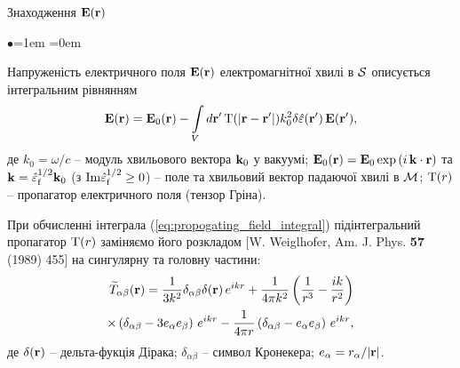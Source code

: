 \documentclass[10pt]{beamer}
\begin{document}
\begin{frame}{Знаходження ${\bf E} ({\bf r})$}
\footnotesize

\begin{list}{$\bullet$}{\leftmargin=1em \itemindent=0em}
\item
Напруженість електричного поля ${\bf E} ({\bf r})$ електромагнітної хвилі в $\cal{S}$ описується інтегральним рівнянням
\begin{equation}\label{eq:propogating_field_integral} 
{\rm {\bf E}}({\rm {\bf r}}) = {\rm {\bf E}}_{0} ({\rm
{\bf r}}) - {\int\limits_{V} {d{\rm {\bf {r}'}}\,}} {\rm T}(|{\rm {\bf
r}}-{\rm {\bf {r}'}}|) k_{0}^{2} \delta \hat{\varepsilon} ({\rm
{\bf {r}'}})\,{\rm {\bf E}}({\rm {\bf {r}'}}),
\end{equation}
де $k_0=\omega/c$ -- модуль хвильового вектора ${\bf k}_0$ у вакуумі; ${\bf E}_0 ({\bf r}) = {\bf E}_0 \exp{(i\, {\bf k} \cdot{\bf r})}$ та ${\bf k} = \hat{\varepsilon}_{\rm f}^{1/2} {\bf k}_0$ (з ${\rm Im}{\hat{\varepsilon}_{\rm f}}^{1/2} \geq 0$) -- поле та хвильовий вектор падаючої хвилі в $\cal{M}$;
${\rm T}(r)$ -- пропагатор електричного поля (тензор Гріна). 

\item
При обчисленні інтеграла (\ref{eq:propogating_field_integral}) підінтегральний пропагатор ${\rm T}(r)$ заміняємо його розкладом [W. Weiglhofer, Am. J. Phys. {\bf 57} (1989) 455] на сингулярну та головну частини:
\begin{eqnarray}\label{eq:propog_representation} 
{\widetilde T}_{\alpha\beta} ({\rm {\bf
r}}) = \frac{1}{3k^{2}} \delta_{\alpha\beta} \delta ({\rm {\bf
r}})\,e^{ikr} + \frac{1}{4\pi k^{2}}
\left(\frac{1}{r^3}-\frac{ik}{r^2}\right)\nonumber\\
\times\left( \delta _{\alpha\beta} - 3e_{\alpha} e_{\beta}
\right)\,e^{ikr} - \frac{1}{4\pi r}\left( {\delta _{\alpha\beta} -
e_{\alpha} e_{\beta}} \right)\,e^{ikr},
\end{eqnarray}
де $\delta({\bf r})$ -- дельта-фукція Дірака; $\delta_{\alpha\beta}$ -- символ Кронекера; $e_\alpha = r_\alpha/|{\bf r}|$.

\end{list}

\end{frame}
\end{document}

